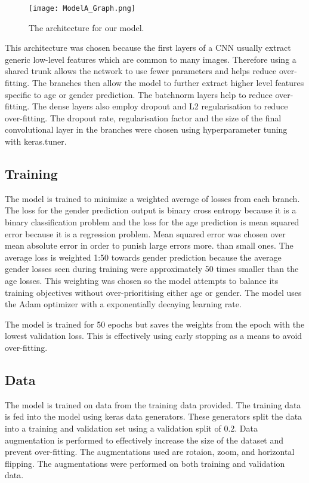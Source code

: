 \begin{figure}
    \centering
    \texttt{[image: ModelA\_Graph.png]}
    \caption{\label{fig:ModelAGraph} The architecture for our model.}
\end{figure}

This architecture was chosen because the first layers of a CNN usually extract generic low-level features which are 
common to many images. Therefore using a shared trunk allows the network to use fewer parameters and helps reduce 
over-fitting. The branches then allow the model to further extract higher level features specific to age or gender 
prediction. The batchnorm layers help to reduce over-fitting. The dense layers also employ dropout and L2 regularisation
to reduce over-fitting. The dropout rate, regularisation factor and the size of the final convolutional layer in 
the branches were chosen using hyperparameter tuning with keras.tuner.

\subsection{Training}
The model is trained to minimize a weighted average of losses from each branch. The loss for the gender prediction
output is binary cross entropy because it is a binary classification problem and the loss for the age prediction 
is mean squared error because it is a regression problem. Mean squared error was chosen over mean absolute error 
in order to punish large errors more. than small ones. The average loss is weighted 1:50 towards gender prediction
because the average gender losses seen during training were approximately 50 times smaller than the age losses. This 
weighting was chosen so the model attempts to balance its training objectives without over-prioritising either age or 
gender. The model uses the Adam optimizer with a exponentially decaying learning rate. 

The model is trained for 50 epochs but saves the weights from the epoch with the lowest validation loss. This is 
effectively using early stopping as a means to avoid over-fitting.

\subsection{Data}
The model is trained on data from the training data provided. The training data is fed into the model using keras 
data generators. These generators split the data into a training and validation set using a validation split of 0.2. 
Data augmentation is performed to effectively increase the size of the dataset and prevent over-fitting. The augmentations
used are rotaion, zoom, and horizontal flipping. The augmentations were performed on both training and validation data.

